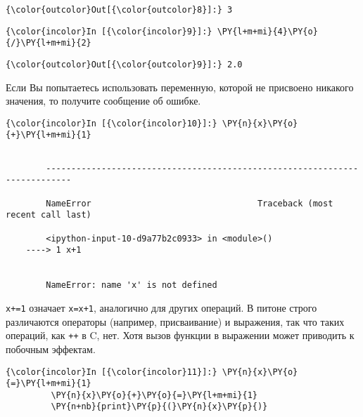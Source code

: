             \begin{Verbatim}[commandchars=\\\{\}]
{\color{outcolor}Out[{\color{outcolor}8}]:} 3
\end{Verbatim}
        
    \begin{Verbatim}[commandchars=\\\{\}]
{\color{incolor}In [{\color{incolor}9}]:} \PY{l+m+mi}{4}\PY{o}{/}\PY{l+m+mi}{2}
\end{Verbatim}

            \begin{Verbatim}[commandchars=\\\{\}]
{\color{outcolor}Out[{\color{outcolor}9}]:} 2.0
\end{Verbatim}
        
    Если Вы попытаетесь использовать переменную, которой не присвоено
никакого значения, то получите сообщение об ошибке.

    \begin{Verbatim}[commandchars=\\\{\}]
{\color{incolor}In [{\color{incolor}10}]:} \PY{n}{x}\PY{o}{+}\PY{l+m+mi}{1}
\end{Verbatim}

    \begin{Verbatim}[commandchars=\\\{\}]

        ---------------------------------------------------------------------------

        NameError                                 Traceback (most recent call last)

        <ipython-input-10-d9a77b2c0933> in <module>()
    ----> 1 x+1
    

        NameError: name 'x' is not defined

    \end{Verbatim}

    \texttt{x+=1} означает \texttt{x=x+1}, аналогично для других операций. В
питоне строго различаются операторы (например, присваивание) и
выражения, так что таких операций, как \texttt{++} в C, нет. Хотя вызов
функции в выражении может приводить к побочным эффектам.

    \begin{Verbatim}[commandchars=\\\{\}]
{\color{incolor}In [{\color{incolor}11}]:} \PY{n}{x}\PY{o}{=}\PY{l+m+mi}{1}
         \PY{n}{x}\PY{o}{+}\PY{o}{=}\PY{l+m+mi}{1}
         \PY{n+nb}{print}\PY{p}{(}\PY{n}{x}\PY{p}{)}
\end{Verbatim}

